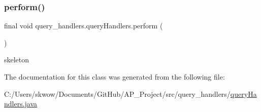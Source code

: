 \subsubsection{\texorpdfstring{perform()}{perform()}}
{\footnotesize\ttfamily final void query\+\_\+handlers.\+query\+Handlers.\+perform (\begin{DoxyParamCaption}{ }\end{DoxyParamCaption})}



skeleton 



The documentation for this class was generated from the following file\+:\begin{DoxyCompactItemize}
\item 
C\+:/\+Users/skwow/\+Documents/\+Git\+Hub/\+A\+P\+\_\+\+Project/src/query\+\_\+handlers/\hyperlink{query_handlers_8java}{query\+Handlers.\+java}\end{DoxyCompactItemize}
